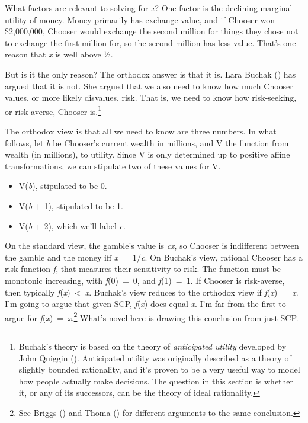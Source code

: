 \documentclass[
  11pt,
  letterpaper,
  DIV=11,
  numbers=noendperiod,
  twoside]{scrartcl}
\providecommand{\tightlist}{%
  \setlength{\itemsep}{0pt}\setlength{\parskip}{0pt}}
\begin{document}
What factors are relevant to solving for \emph{x}? One factor is the
declining marginal utility of money. Money primarily has exchange value,
and if Chooser won \$2,000,000, Chooser would exchange the second
million for things they chose not to exchange the first million for, so
the second million has less value. That's one reason that \emph{x} is
well above ½.

But is it the only reason? The orthodox answer is that it is. Lara
Buchak () has argued that it is not. She
argued that we also need to know how much Chooser values, or more likely
disvalues, risk. That is, we need to know how risk-seeking, or
risk-averse, Chooser is.\footnote{Buchak's theory is based on the theory
  of \emph{anticipated utility} developed by John Quiggin
  (). Anticipated utility was originally
  described as a theory of slightly bounded rationality, and it's proven
  to be a very useful way to model how people actually make decisions.
  The question in this section is whether it, or any of its successors,
  can be the theory of ideal rationality.}

The orthodox view is that all we need to know are three numbers. In what
follows, let \emph{b} be Chooser's current wealth in millions, and V the
function from wealth (in millions), to utility. Since V is only
determined up to positive affine transformations, we can stipulate two
of these values for V.

\begin{itemize}
\tightlist
\item
  V(\emph{b}), stipulated to be 0.
\item
  V(\emph{b} + 1), stipulated to be 1.
\item
  V(\emph{b} + 2), which we'll label \emph{c}.
\end{itemize}

On the standard view, the gamble's value is \emph{cx}, so Chooser is
indifferent between the gamble and the money iff \emph{x}~=~1/\emph{c}.
On Buchak's view, rational Chooser has a risk function \emph{f}, that
measures their sensitivity to risk. The function must be monotonic
increasing, with \emph{f}(0)~=~0, and \emph{f}(1)~=~1. If Chooser is
risk-averse, then typically \emph{f}(\emph{x})~\textless~\emph{x}.
Buchak's view reduces to the orthodox view if
\emph{f}(\emph{x})~=~\emph{x}. I'm going to argue that given SCP,
\emph{f}(\emph{x}) does equal \emph{x}. I'm far from the first to argue
for \emph{f}(\emph{x})~=~\emph{x}.\footnote{See Briggs
  () and Thoma
  () for different arguments to the same
  conclusion.} What's novel here is drawing this conclusion from just
SCP.
\end{document}
